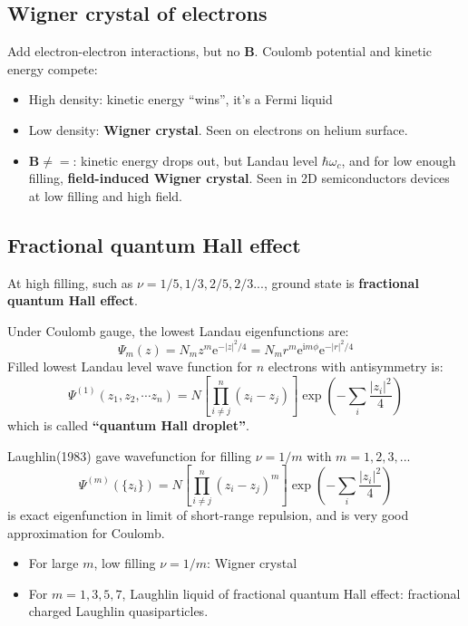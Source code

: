 \documentclass[11pt,letterpaper]{article}
\numberwithin{equation}{section} %
\renewcommand*{\vec}[1]{\bm{#1}}
\newcommand\mi{\mathrm{i}}
\newcommand\e{\mathrm{e}}
\begin{document}
\subsection{Wigner crystal of electrons}
\label{sub:wigner_crystal_of_electrons}
Add electron-electron interactions, but no $\vec B$. Coulomb potential and
kinetic energy compete: 
\begin{itemize}
  \item High density: kinetic energy ``wins'', it's a Fermi liquid
  \item Low density: \textbf{Wigner crystal}. Seen on electrons on helium
	  surface. 
  \item $\vec B\neq =$: kinetic energy drops out, but Landau level
	  $\hbar\omega_c$, and for low enough filling, \textbf{field-induced
	  Wigner crystal}. Seen in 2D semiconductors devices at low filling and
	  high field.
\end{itemize}

\subsection{Fractional quantum Hall effect}
\label{sub:fractional_quantum_hall_effect}
At high filling, such as $\nu = 1/5, 1/3, 2/5, 2/3...$, ground state is
\textbf{fractional quantum Hall effect}.

Under Coulomb gauge, the lowest Landau eigenfunctions are: 
\begin{equation}
	\Psi_m(z) = N_m z^m\e^{-|z|^2/4} = N_m r^m \e^{\mi m\phi}\e^{-|r|^2/4}
\end{equation}
Filled lowest Landau level wave function for $n$ electrons with antisymmetry is: 
\begin{equation}
	\Psi^{(1)}(z_1, z_2, \cdots z_n) = N \left[ \prod_{i\neq j}^n (z_i-z_j)
	\right]\exp \left(-\sum_i \frac{|z_i|^2}{4}\right)
\end{equation}
which is called \textbf{``quantum Hall droplet''}. 

Laughlin(1983) gave wavefunction for filling $\nu=1/m$ with $m=1,2,3,...$
\begin{equation}
	\Psi^{(m)}(\{z_i\}) =  N \left[ \prod_{i\neq j}^n (z_i-z_j)^m
	\right]\exp \left(-\sum_i \frac{|z_i|^2}{4}\right)
\end{equation}
is exact eigenfunction in limit of short-range repulsion, and is very good
approximation for Coulomb.
\begin{itemize}
  \item For large $m$, low filling $\nu = 1/m$: Wigner crystal
  \item For $m=1,3,5,7$, Laughlin liquid of fractional quantum Hall effect:
	  fractional charged Laughlin quasiparticles. 
\end{itemize}
\end{document}
